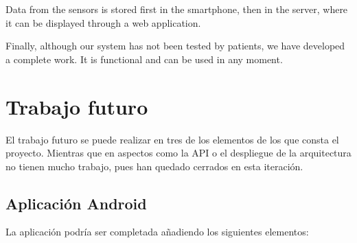 \documentclass[11pt,spanish]{article}
\begin{document}
Data from the sensors is stored first in the smartphone, then in the server, where it can be displayed through a web application.
\newline

Finally, although our system has not been tested by patients, we have developed a complete work. It is functional and can be used in any moment.
\newpage

\section{Trabajo futuro}
El trabajo futuro se puede realizar en tres de los elementos de los que consta el proyecto. Mientras que en aspectos como la API o el despliegue de la arquitectura no tienen mucho trabajo, pues han quedado cerrados en esta iteración.

\subsection{Aplicación Android}
La aplicación podría ser completada añadiendo los siguientes elementos:
\end{document}
